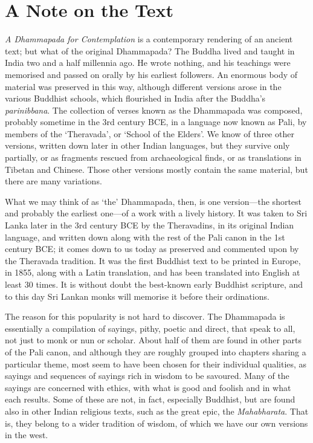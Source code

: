 
\chapter{A Note on the Text}


\emph{A Dhammapada for Contemplation} is a contemporary rendering of an ancient text; but what of the original Dhammapada? The Buddha lived and taught in India two and a half millennia ago. He wrote nothing, and his teachings were memorised and passed on orally by his earliest followers. An enormous body of material was preserved in this way, although different versions arose in the various Buddhist schools, which flourished in India after the Buddha’s \emph{parinibbana}. The collection of verses known as the Dhammapada was composed, probably sometime in the 3rd century BCE, in a language now known as Pali, by members of the ‘Theravada’, or ‘School of the Elders’. We know of three other versions, written down later in other Indian languages, but they survive only partially, or as fragments rescued from archaeological finds, or as translations in Tibetan and Chinese. Those other versions mostly contain the same material, but there are many variations.

What we may think of as ‘the’ Dhammapada, then, is one version—the shortest and probably the earliest one—of a work with a lively history. It was taken to Sri Lanka later in the 3rd century BCE by the Theravadins, in its original Indian language, and written down along with the rest of the Pali canon in the 1st century BCE; it comes down to us today as preserved and commented upon by the Theravada tradition. It was the first Buddhist text to be printed in Europe, in 1855, along with a Latin translation, and has been translated into English at least 30 times. It is without doubt the best-known early Buddhist scripture, and to this day Sri Lankan monks will memorise it before their ordinations.

The reason for this popularity is not hard to discover. The Dhammapada is essentially a compilation of sayings, pithy, poetic and direct, that speak to all, not just to monk or nun or scholar. About half of them are found in other parts of the Pali canon, and although they are roughly grouped into chapters sharing a particular theme, most seem to have been chosen for their individual qualities, as sayings and sequences of sayings rich in wisdom to be savoured. Many of the sayings are concerned with ethics, with what is good and foolish and in what each results. Some of these are not, in fact, especially Buddhist, but are found also in other Indian religious texts, such as the great epic, the \emph{Mahabharata}. That is, they belong to a wider tradition of wisdom, of which we have our own versions in the west.


